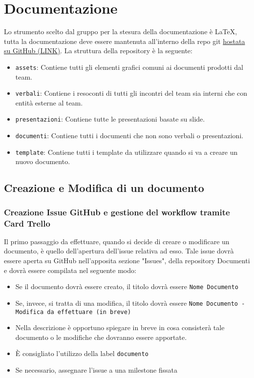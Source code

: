 \section{Documentazione}

Lo strumento scelto dal gruppo per la stesura della documentazione è \LaTeX,
tutta la documentazione deve essere mantenuta all'interno della repo git
\href{https://github.com/Club-Swendwich/Documenti}{hostata su GitHub (LINK)}.
La struttura della repository è la seguente:
\begin{itemize}
    \item \texttt{assets}: Contiene tutti gli elementi grafici comuni ai documenti
        prodotti dal team.
    \item \texttt{verbali}: Contiene i resoconti di tutti gli incontri del team sia
        interni che con entità esterne al team.
    \item \texttt{presentazioni}: Contiene tutte le presentazioni basate su slide.
    \item \texttt{documenti}: Contiene tutti i documenti che non sono verbali o
        presentazioni.
    \item \texttt{template}: Contiene tutti i template da utilizzare quando si va a
        creare un nuovo documento.
\end{itemize}

\subsection{Creazione e Modifica di un documento}

\subsubsection{Creazione Issue GitHub e gestione del workflow tramite Card Trello}
Il primo passaggio da effettuare, quando si decide di creare o modificare un documento, è quello dell'apertura dell'issue relativa ad esso.
Tale issue dovrà essere aperta su GitHub nell'apposita sezione "Issues", della repository Documenti e dovrà essere compilata nel seguente modo:
\begin{itemize}
    \item Se il documento dovrà essere creato, il titolo dovrà essere
    \texttt{Nome Documento}
    \item Se, invece, si tratta di una modifica, il titolo dovrà essere
    \texttt{Nome Documento - Modifica da effettuare (in breve)}
    \item Nella descrizione è opportuno spiegare in breve in cosa consisterà tale documento o le modifiche che dovranno essere apportate.
    \item È consigliato l'utilizzo della label \texttt{documento}
    \item Se necessario, assegnare l'issue a una milestone fissata
\end{itemize}

